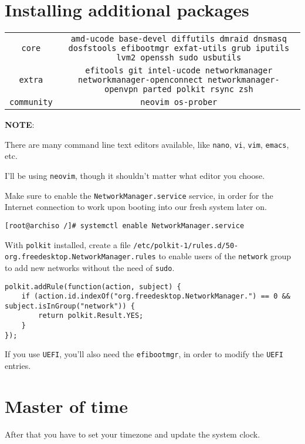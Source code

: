 \documentclass[9pt]{report}
\newcommand{\admonition}[2]{\textbf{#1}: {#2}}
\begin{document}
\hypertarget{x-installing-additional-packages}{\section{Installing additional packages}}
\begin{center}
\begin{tabular}{|c|c|}
\hline
\texttt{core} & \texttt{amd-ucode base-devel diffutils dmraid dnsmasq dosfstools efibootmgr exfat-utils grub iputils lvm2 openssh sudo usbutils} \\ 
\texttt{extra} & \texttt{efitools git intel-ucode networkmanager networkmanager-openconnect networkmanager-openvpn parted polkit rsync zsh} \\ 
\texttt{community} & \texttt{neovim os-prober} \\ 
\hline
\end{tabular}
\end{center}

\admonition{NOTE}{There are many command line text editors available, like \texttt{nano}, \texttt{vi}, \texttt{vim}, \texttt{emacs}, etc.


I’ll be using \texttt{neovim}, though it shouldn’t matter what editor you choose.

}
Make sure to enable the \texttt{NetworkManager.service} service, in order for the Internet connection to work upon booting into our fresh system later on.


\begin{verbatim}
[root@archiso /]# systemctl enable NetworkManager.service
\end{verbatim}

With \texttt{polkit} installed, create a file \texttt{/etc/polkit-1/rules.d/50-org.freedesktop.NetworkManager.rules} to enable users of the \texttt{network} group to add new networks without the need of \texttt{sudo}.


\begin{verbatim}
polkit.addRule(function(action, subject) {
    if (action.id.indexOf("org.freedesktop.NetworkManager.") == 0 && subject.isInGroup("network")) {
        return polkit.Result.YES;
    }
});
\end{verbatim}

If you use \texttt{UEFI}, you’ll also need the \texttt{efibootmgr}, in order to modify the \texttt{UEFI} entries.



\vfill\eject

\hypertarget{x-master-of-time}{\section{Master of time}}
After that you have to set your timezone and update the system clock.
\end{document}
